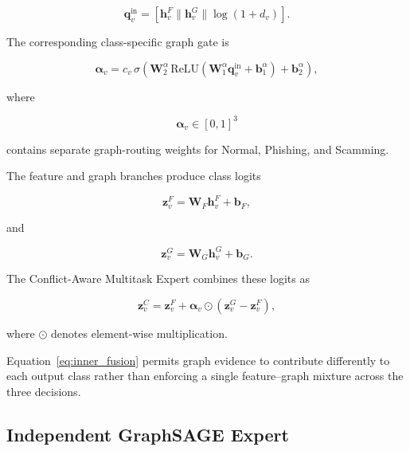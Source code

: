 \documentclass{ieeeaccess}
\begin{document}
\begin{equation}
\mathbf{q}^{\mathrm{in}}_v
=
\left[
\mathbf{h}^{F}_v
\parallel
\mathbf{h}^{G}_v
\parallel
\log(1+d_v)
\right].
\end{equation}

The corresponding class-specific graph gate is

\begin{equation}
\boldsymbol{\alpha}_v
=
c_v\,
\sigma
\left(
\mathbf{W}^{\alpha}_2
\,
\mathrm{ReLU}
\left(
\mathbf{W}^{\alpha}_1
\mathbf{q}^{\mathrm{in}}_v
+
\mathbf{b}^{\alpha}_1
\right)
+
\mathbf{b}^{\alpha}_2
\right),
\label{eq:inner_gate}
\end{equation}

where

\begin{equation}
\boldsymbol{\alpha}_v
\in [0,1]^3
\end{equation}

contains separate graph-routing weights for Normal, Phishing, and Scamming.

The feature and graph branches produce class logits

\begin{equation}
\mathbf{z}^{F}_v
=
\mathbf{W}_{F}\mathbf{h}^{F}_v
+
\mathbf{b}_{F},
\end{equation}

and

\begin{equation}
\mathbf{z}^{G}_v
=
\mathbf{W}_{G}\mathbf{h}^{G}_v
+
\mathbf{b}_{G}.
\end{equation}

The Conflict-Aware Multitask Expert combines these logits as

\begin{equation}
\mathbf{z}^{C}_v
=
\mathbf{z}^{F}_v
+
\boldsymbol{\alpha}_v
\odot
\left(
\mathbf{z}^{G}_v
-
\mathbf{z}^{F}_v
\right),
\label{eq:inner_fusion}
\end{equation}

where \(\odot\) denotes element-wise multiplication.

Equation~\ref{eq:inner_fusion} permits graph evidence to contribute differently to each output class rather than enforcing a single feature--graph mixture across the three decisions.


\subsection{Independent GraphSAGE Expert}
\end{document}
